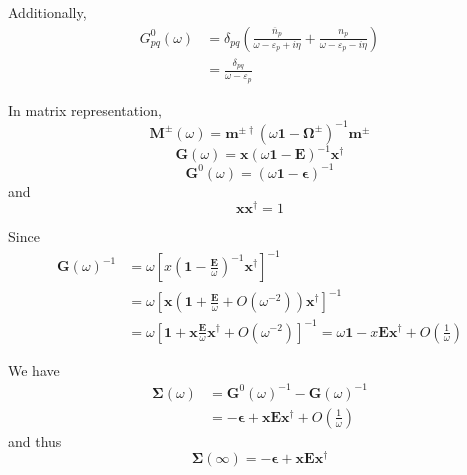 Additionally,
\begin{equation}
	\begin{aligned}
		G_{p q}^{0}(\omega)&=\delta_{p q}\left(\frac{\overline{n}_{p}}{\omega-\varepsilon_{p}+i \eta}+\frac{n_{p}}{\omega-\varepsilon_{p}-i \eta}\right)
		\\
		&=\frac{\delta_{p q}}{\omega-\varepsilon_{p}}
	\end{aligned}
\end{equation}

In matrix representation,
\begin{equation}
	\boldsymbol{M}^{ \pm}(\omega)=\boldsymbol{m}^{ \pm \dagger}\left(\omega \mathbf{1}-\boldsymbol{\Omega}^{ \pm}\right)^{-1} \boldsymbol{m}^{ \pm}
\end{equation}
\begin{equation}
	\boldsymbol{G}(\omega)=\boldsymbol{x}(\omega \mathbf{1}-\boldsymbol{E})^{-1} \boldsymbol{x}^{\dagger}
\end{equation}
\begin{equation}
	\boldsymbol{G}^0(\omega)=(\omega \mathbf{1} - \boldsymbol{\epsilon})^{-1}
\end{equation}
and 
\begin{equation}
	\boldsymbol{x} \boldsymbol{x}^{\dagger}=1
\end{equation}

Since
\begin{equation}
	\begin{aligned} \boldsymbol{G}(\omega)^{-1} &=\omega\left[x\left(\mathbf{1}-\frac{\boldsymbol{E}}{\omega}\right)^{-1} \boldsymbol{x}^{\dagger}\right]^{-1} \\ &=\omega\left[\boldsymbol{x}\left(\mathbf{1}+\frac{\boldsymbol{E}}{\omega}+O\left(\omega^{-2}\right)\right) \boldsymbol{x}^{\dagger}\right]^{-1} \\ &=\omega\left[\mathbf{1}+\boldsymbol{x} \frac{\boldsymbol{E}}{\omega} \boldsymbol{x}^{\dagger}+O\left(\omega^{-2}\right)\right]^{-1}=\omega \mathbf{1}-x \boldsymbol{E} \boldsymbol{x}^{\dagger}+O\left(\frac{1}{\omega}\right) \end{aligned}
\end{equation}

We have 
\begin{equation}
	\begin{aligned}
		\boldsymbol{\Sigma}(\omega)&=\boldsymbol{G}^{0}(\omega)^{-1}-\boldsymbol{G}(\omega)^{-1}
		\\
		&=-\boldsymbol{\epsilon}+\boldsymbol{x} \boldsymbol{E} \boldsymbol{x}^{\dagger}+O\left(\frac{1}{\omega}\right)
	\end{aligned}
\end{equation}
and thus
\begin{equation}
	\boldsymbol{\Sigma}(\infty)=-\boldsymbol{\epsilon}+\boldsymbol{x} \boldsymbol{E} \boldsymbol{x}^{\dagger}
\end{equation}


